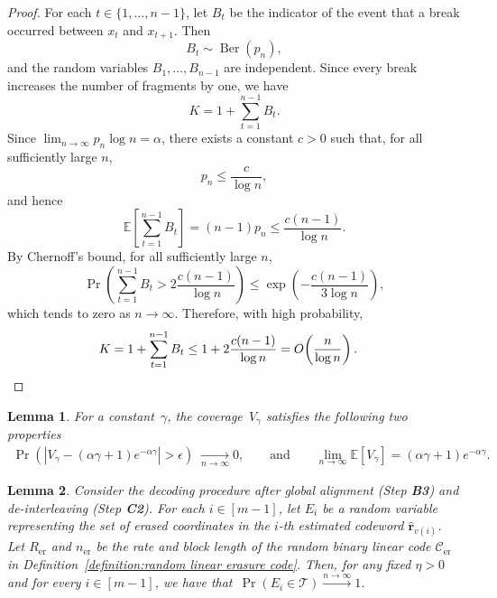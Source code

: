 \documentclass[journal,letterpaper,onecolumn,11pt]{IEEEtran}
\newcommand{\cC}{\mathcal{C}}
\newcommand{\cT}{\mathcal{T}}
\newtheorem{lemma}{Lemma}
\begin{document}
\begin{proof}
For each $t\in\{1,\dots,n-1\}$, let $B_t$ be the indicator of the event that a break occurred between $x_t$ and $x_{t+1}$. Then
\[
    B_t \sim \operatorname{Ber}(p_n),
\]
and the random variables $B_1,\dots,B_{n-1}$ are independent. Since every break
increases the number of fragments by one, we have
\[
    K = 1+\sum_{t=1}^{n-1} B_t.
\]
Since $\lim_{n\to\infty} p_n\log n=\alpha$, there exists a constant $c>0$ such that,
for all sufficiently large $n$,
\[
    p_n \le \frac{c}{\log n},
\]
and hence
\[
    \mathbb{E}\left[\sum_{t=1}^{n-1} B_t\right]
    =
    (n-1)p_n
    \le
    \frac{c(n-1)}{\log n}.
\]
By Chernoff's bound, for all sufficiently large $n$,
\[
    \Pr\left(
        \sum_{t=1}^{n-1}B_t
        >
        2\frac{c(n-1)}{\log n}
    \right)
    \le
    \exp\left(-\frac{c(n-1)}{3\log n}\right),
\]
which tends to zero as $n\to\infty$. Therefore, with high probability,
\begin{align*}
    K
    &=
    1+\sum_{t=1}^{n-1}B_t
    \le
    1+2\frac{c(n-1)}{\log n}
    =
    O\!\left(\frac{n}{\log n}\right).\qedhere
\end{align*}
\end{proof}
\begin{lemma}\label{lemma:concentration of coverage}\cite[Lemma~6]{shomorony2021torn}
For a constant~$\gamma$, the coverage~$V_\gamma$ satisfies the following two properties
    \begin{align}\label{Equation: limit of coverage}
        \Pr\!\left( \left| V_{\gamma} - (\alpha\gamma + 1)e^{-\alpha\gamma} \right| > \epsilon \right)
\;\xrightarrow[n\to\infty]{} 0,\qquad \text{and} \qquad \lim_{n \to \infty} \mathbb{E}[V_\gamma]
    = (\alpha \gamma + 1)e^{-\alpha \gamma}.
\end{align}
\end{lemma}

\begin{lemma}\label{lemma:bound on number of erasures}
Consider the decoding procedure after global alignment (Step \textbf{B3}) and de-interleaving (Step \textbf{C2}).
For each $i\in[m-1]$, let $E_i$ be a random variable representing the set of erased coordinates in the $i$-th estimated codeword $\hat{\mathbf{r}}_{v(i)}$.
Let $R_{\mathrm{er}}$ and $n_{\mathrm{er}}$ be the rate and block length of the random binary linear code $\cC_{\mathrm{er}}$ in Definition~\ref{definition:random linear erasure code}. 
Then, for any fixed $\eta>0$ and for every $i \in [m-1]$, we have that~$\Pr(E_i\in\cT)\overset{n\to\infty}{\longrightarrow }1$.
\end{lemma}
\end{document}
